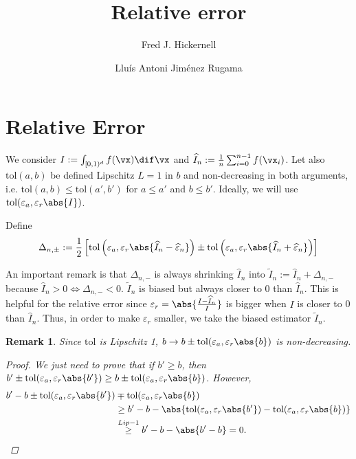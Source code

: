 \documentclass[]{elsarticle}
\newtheorem{remark}{Remark}
\theoremstyle{definition}
\newcommand{\cube}{[0,1)^d}
\newcommand{\tol}{\text{tol}}
\begin{document}
\begin{frontmatter}

\title{Relative error}
\author{Fred J. Hickernell}
\address{Room E1-208, Department of Applied Mathematics, Illinois Institute of Technology,\\ 10 W.\ 32$^{\text{nd}}$ St., Chicago, IL 60616}
\author{Llu\'{i}s Antoni Jim\'{e}nez Rugama}
\address{Room E1-120, Department of Applied Mathematics, Illinois Institute of Technology,\\ 10 W.\ 32$^{\text{nd}}$ St., Chicago, IL 60616}
\begin{abstract}
\end{abstract}

\end{frontmatter}

\section{Relative Error}
We consider $I:=\int_{\cube}f(\vx)\dif \vx$ and $\widehat{I}_n:=\frac 1 n \sum_{i=0}^{n-1}f(\vx_i)$. Let also $\tol(a,b)$ be defined Lipschitz $L=1$ in $b$ and non-decreasing in both arguments, i.e. $\tol(a,b)\leq \tol(a',b')$ for $a\leq a'$ and $b\leq b'$. Ideally, we will use $\tol(\varepsilon_a,\varepsilon_r\abs{I})$.

Define
\[
\Delta_{n,\pm}:=\frac 1 2 \left[ \tol\left(\varepsilon_a,\varepsilon_r\abs{\widehat{I}_n-\widehat{\varepsilon}_n}\right) \pm \tol\left(\varepsilon_a,\varepsilon_r\abs{\widehat{I}_n+\widehat{\varepsilon}_n}\right) \right]
\]

An important remark is that $\Delta_{n,-}$ is always shrinking $\widehat{I}_n$ into $\widetilde{I}_n:=\widehat{I}_n+\Delta_{n,-}$ because $\widehat{I}_n>0\Longleftrightarrow\Delta_{n,-}<0$. $\widetilde{I}_n$ is biased but always closer to 0 than $\widehat{I}_n$. This is helpful for the relative error since $\varepsilon_r=\abs{\frac{I-\widehat{I}_n}{I}}$ is bigger when $I$ is closer to 0 than $\widehat{I}_n$. Thus, in order to make $\varepsilon_r$ smaller, we take the biased estimator $\widetilde{I}_n$.

\begin{remark}
Since $\tol$ is Lipschitz 1, $b\rightarrow b\pm \tol(\varepsilon_a,\varepsilon_r\abs{b})$ is non-decreasing.
\begin{proof}
We just need to prove that if $b'\geq b$, then $b'\pm \tol(\varepsilon_a,\varepsilon_r\abs{b'})\geq b\pm \tol(\varepsilon_a,\varepsilon_r\abs{b})$. However,
\begin{align*}
b'-b \pm \tol(\varepsilon_a,\varepsilon_r\abs{b'}) &\mp \tol(\varepsilon_a,\varepsilon_r\abs{b})\\
&\geq b'-b - \abs{ \tol(\varepsilon_a,\varepsilon_r\abs{b'}) - \tol(\varepsilon_a,\varepsilon_r\abs{b})}\\
&\stackrel{Lip-1}{\geq} b'-b - \abs{b'-b} =0.
\end{align*}
\end{proof}
\end{remark}
\end{document}
